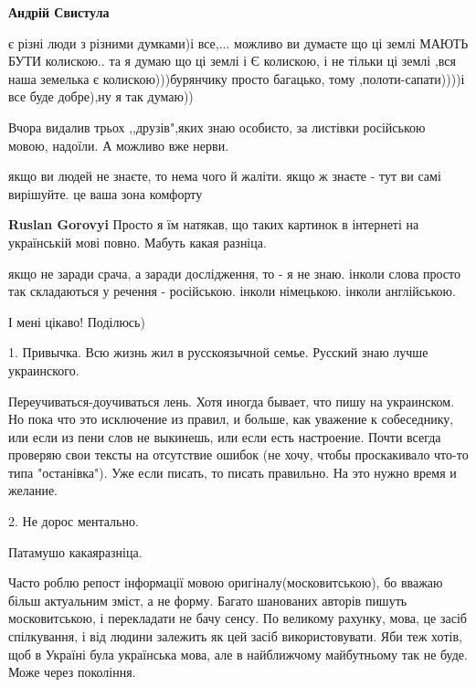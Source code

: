 \begin{itemize}
\begin{itemize}
\textbf{Андрій Свистула} 

є різні люди з різними думками)і все,... можливо ви думаєте що ці землі МАЮТЬ
БУТИ колискою.. та я думаю що ці землі і Є колискою, і не тільки ці землі ,вся
наша земелька є колискою)))бурянчику просто багацько, тому ,полоти-сапати))))і
все буде добре),ну я так думаю))

\end{itemize} %

Вчора видалив трьох ,,друзів",яких знаю особисто, за листівки російською мовою, надоїли.
А можливо вже нерви.

\begin{itemize} %
якщо ви людей не знаєте, то нема чого й жаліти. якщо ж знаєте - тут ви самі вирішуйте. це ваша зона комфорту

\textbf{Ruslan Gorovyi} Просто я їм натякав, що таких картинок в інтернеті на українській мові повно. Мабуть какая разніца.
\end{itemize} %


якщо не заради срача, а заради дослідження, то - я не знаю. інколи слова просто
так складаються у речення - російською. інколи німецькою. інколи англійською.

І мені цікаво!
Поділюсь)


1. Привычка. Всю жизнь жил в русскоязычной семье. Русский знаю лучше
украинского.\par Переучиваться-доучиваться лень. Хотя иногда бывает, что пишу на
украинском. Но пока что это исключение из правил, и больше, как уважение к
собеседнику, или если из пени слов не выкинешь, или если есть настроение. Почти
всегда проверяю свои тексты на отсутствие ошибок (не хочу, чтобы проскакивало
что-то типа "останівка"). Уже если писать, то писать правильно. На это нужно
время и желание.

2. Не дорос ментально.


Патамушо какаяразніца.


Часто роблю репост інформації мовою оригіналу(московитською), бо вважаю більш
актуальним зміст, а не форму. Багато шанованих авторів пишуть московитською, і
перекладати не бачу сенсу. По великому рахунку, мова, це засіб спілкування, і
від людини залежить як цей засіб використовувати. Яби теж хотів, щоб в Україні
була українська мова, але в найближчому майбутньому так не буде. Може через
покоління.


\end{itemize}

